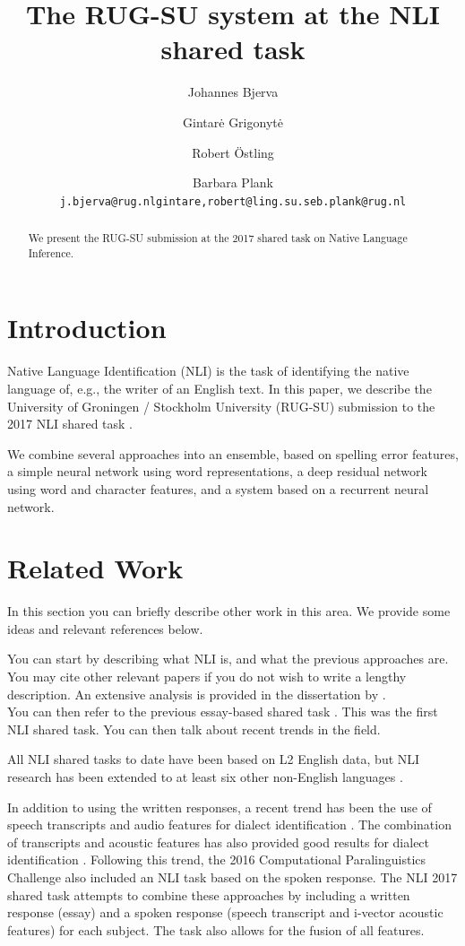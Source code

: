 \documentclass[11pt,letterpaper]{article}
\title{The RUG-SU system at the NLI shared task}
\author{Johannes Bjerva \and Gintar\.e Grigonyt\.e \and Robert {\"O}stling \and Barbara Plank \\
{\tt j.bjerva@rug.nl\hfill{gintare,robert}@ling.su.se\hfill b.plank@rug.nl}}
\date{}
\begin{document}
\maketitle

\begin{abstract}
    We present the RUG-SU submission at the 2017 shared task on Native
    Language Inference.
\end{abstract}


\section{Introduction}

Native Language Identification (NLI) is the task of identifying the native language of, e.g., the writer of an English text.
In this paper, we describe the University of Groningen / Stockholm University (RUG-SU) submission to the 2017 NLI shared task \citep{nli2017}.

We combine several approaches into an ensemble, based on spelling error features, a simple neural network using word representations, a deep residual network using word and character features, and a system based on a recurrent neural network.

\section{Related Work}

In this section you can briefly describe other work in this area. We provide some ideas and relevant references below.

You can start by describing what NLI is, and what the previous approaches are.
You may cite other relevant papers if you do not wish to write a lengthy description.
An extensive analysis is provided in the dissertation by .
\\

You can then refer to the previous essay-based shared task \cite{nli2013}. This was the first NLI shared task. You can then talk about recent trends in the field.

All NLI shared tasks to date have been based on L2 English data, but NLI research has been extended to at least six other non-English languages \cite{multilingual-nli}.

In addition to using the written responses, a recent trend has been the use of speech transcripts and audio features for dialect identification \cite{vardial2016}.
The combination of transcripts and acoustic features has also provided good results for dialect identification \cite{vardial2017}.
Following this trend, the 2016 Computational Paralinguistics Challenge \cite{compare2016} also included an NLI task based on the spoken response.
The NLI 2017 shared task attempts to combine these approaches by including a written response (essay) and a spoken response (speech transcript and i-vector acoustic features) for each subject. The task also allows for the fusion of all features.
\end{document}

